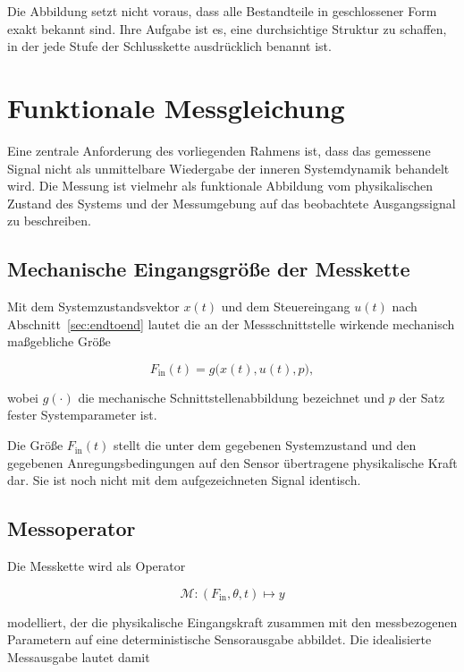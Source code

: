 \documentclass[12pt,a4paper]{report}
\begin{document}
Die Abbildung setzt nicht voraus, dass alle Bestandteile in geschlossener
Form exakt bekannt sind. Ihre Aufgabe ist es, eine durchsichtige Struktur
zu schaffen, in der jede Stufe der Schlusskette ausdrücklich benannt ist.

\section{Funktionale Messgleichung}
\label{sec:messgleichung}

Eine zentrale Anforderung des vorliegenden Rahmens ist, dass das
gemessene Signal nicht als unmittelbare Wiedergabe der inneren
Systemdynamik behandelt wird. Die Messung ist vielmehr als funktionale
Abbildung vom physikalischen Zustand des Systems und der Messumgebung auf
das beobachtete Ausgangssignal zu beschreiben.

\subsection{Mechanische Eingangsgröße der Messkette}

Mit dem Systemzustandsvektor $x(t)$ und dem Steuereingang $u(t)$ nach
Abschnitt~\ref{sec:endtoend} lautet die an der Messschnittstelle wirkende
mechanisch maßgebliche Größe

\begin{equation}
F_{\mathrm{in}}(t) = g\bigl(x(t),u(t),p\bigr),
\label{eq:mech-input}
\end{equation}

wobei $g(\cdot)$ die mechanische Schnittstellenabbildung bezeichnet und
$p$ der Satz fester Systemparameter ist.

Die Größe $F_{\mathrm{in}}(t)$ stellt die unter dem gegebenen
Systemzustand und den gegebenen Anregungsbedingungen auf den Sensor
übertragene physikalische Kraft dar. Sie ist noch nicht mit dem
aufgezeichneten Signal identisch.

\subsection{Messoperator}

Die Messkette wird als Operator

\[
\mathcal{M} : (F_{\mathrm{in}}, \theta, t) \mapsto y
\]

modelliert, der die physikalische Eingangskraft zusammen mit den
messbezogenen Parametern auf eine deterministische Sensorausgabe
abbildet. Die idealisierte Messausgabe lautet damit
\end{document}
